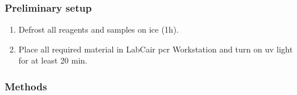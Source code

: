\subsubsection{Preliminary setup}

\begin{enumerate}
\item Defrost all reagents and samples on ice (1h). 
\item Place all required material in LabCair \gls{pcr} Workstation and turn on \gls{uv} light for at least 20 min.
\end{enumerate}

\subsubsection{Methods}

